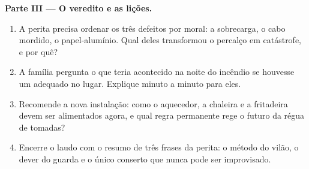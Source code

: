 \begin{problem}
\medskip\noindent\textbf{Parte III --- O veredito e as lições.}
\begin{enumerate}[resume]
  \item A perita precisa ordenar os três defeitos por  moral: a
        sobrecarga, o cabo mordido, o papel-alumínio. Qual deles
        transformou o percalço em catástrofe, e por quê?
  \item A família pergunta o que teria acontecido na noite do
        incêndio se houvesse um  adequado no lugar. Explique
        minuto a minuto para eles.
  \item Recomende a nova instalação: como o aquecedor, a chaleira e a
        fritadeira devem ser alimentados agora, e qual regra
        permanente rege o futuro da régua de tomadas?
  \item Encerre o laudo com o resumo de três frases da perita: o
        método do vilão, o dever do guarda e o único conserto que
        nunca pode ser improvisado.
\end{enumerate}
\end{problem}

